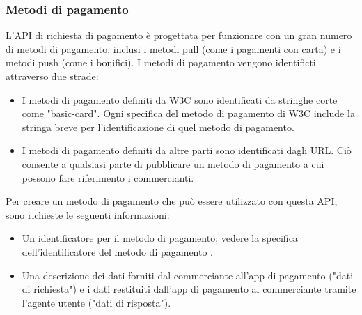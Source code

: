 \documentclass[italian]{article}
\begin{document}
	\subsubsection{Metodi di pagamento}
		L'API di richiesta di pagamento è progettata per funzionare con un gran numero di metodi di pagamento, inclusi i metodi pull (come i pagamenti con carta) e i metodi push (come i bonifici).
	I metodi di pagamento vengono identificti attraverso due strade:
	\begin{itemize}
		\item I metodi di pagamento definiti da W3C sono identificati da stringhe corte come "basic-card". Ogni specifica del metodo di pagamento di W3C include la stringa breve per l'identificazione di quel metodo di pagamento.
		\item I metodi di pagamento definiti da altre parti sono identificati dagli URL. Ciò consente a qualsiasi parte di pubblicare un metodo di pagamento a cui possono fare riferimento i commercianti.
	\end{itemize}
	\begin{flushleft}
	Per creare un metodo di pagamento che può essere utilizzato con questa API, sono richieste le seguenti informazioni:
	\begin{itemize}
	\item Un identificatore per il metodo di pagamento; vedere la specifica dell'identificatore del metodo di pagamento .
	\item Una descrizione dei dati forniti dal commerciante all'app di pagamento ("dati di richiesta") e i dati restituiti dall'app di pagamento al commerciante tramite l'agente utente ("dati di risposta").
	\end{itemize}
	\end{flushleft}
	
\end{document}

